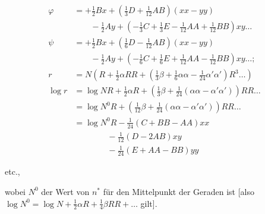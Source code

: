 \[
\begin{aligned}
\varphi&=+\tfrac12Bx+(\tfrac13D+\tfrac1{12}AB)(xx-yy)\\
&\qquad-\tfrac12Ay+(-\tfrac13C+\tfrac13E-\tfrac1{12}AA+\tfrac1{12}BB)xy\ldots\\
\psi&=+\tfrac12Bx+(\tfrac16D-\tfrac1{12}AB)(xx-yy)\\
&\qquad-\tfrac12Ay+(-\tfrac16C+\tfrac16E+\tfrac1{12}AA-\tfrac1{12}BB)xy\ldots;\\[5pt]
r&=N\left(R+\tfrac12\alpha RR+(\tfrac13\beta+\tfrac16\alpha\alpha-\tfrac1{24}\alpha'\alpha')R^3\ldots\right)\\
\log r&=\log NR+\tfrac12\alpha R+\left(\tfrac13\beta+\tfrac1{24}(\alpha\alpha-\alpha'\alpha')\right)RR\ldots\\
&=\log N^0R+\left(\tfrac1{12}\beta+\tfrac1{24}(\alpha\alpha-\alpha'\alpha')\right)RR\ldots\\
&=\log N^0R-\tfrac1{24}(C+BB-AA)xx\\
&\qquad\qquad-\tfrac1{12}(D-2AB)xy\\
&\qquad\qquad-\tfrac1{24}(E+AA-BB)yy
\end{aligned}
\]
\begin{center}etc.,\end{center}
wobei $N^0$ der Wert von $n^*$ für den Mittelpunkt der Geraden ist [also $\log N^0=\log N+\tfrac12\alpha R+\tfrac14\beta RR+\ldots$ gilt].

